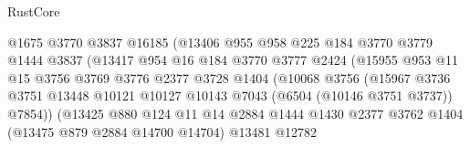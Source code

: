 \begin{lexlean}{RustCore}
\begin{coremodule}
                                  @1675
                                  @3770
                                  @3837
                                  @16185
                                  (@13406
                                    @955
                                    @958
                                    @225
                                    @184
                                    @3770
                                    @3779
                                    @1444
                                    @3837
                                    (@13417
                                      @954
                                      @16
                                      @184
                                      @3770
                                      @3777
                                      @2424
                                      (@15955
                                        @953
                                        @11
                                        @15
                                        @3756
                                        @3769
                                        @3776
                                        @2377
                                        @3728
                                        @1404
                                        (@10068
                                          @3756
                                          (@15967
                                            @3736
                                            @3751
                                            @13448
                                            @10121
                                            @10127
                                            @10143
                                            @7043
                                            (@6504 (@10146 @3751 @3737))
                                            @7854))
                                        (@13425
                                          @880
                                          @124
                                          @11
                                          @14
                                          @2884
                                          @1444
                                          @1430
                                          @2377
                                          @3762
                                          @1404
                                          (@13475 @879 @2884 @14700 @14704)
                                          @13481
                                          @12782

\end{coremodule}
\end{lexlean}
